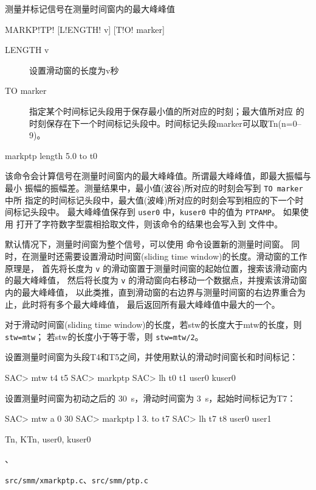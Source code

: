 \label{cmd:markptp}

测量并标记信号在测量时间窗内的最大峰峰值

\begin{SACSTX}
MARKP!TP! [L!ENGTH! v] [T!O! marker]
\end{SACSTX}

\begin{description}
\item [LENGTH v] 设置滑动窗的长度为v秒
\item [TO marker] 指定某个时间标记头段用于保存最小值的所对应的时刻；最大值所对应
    的时刻保存在下一个时间标记头段中。时间标记头段marker可以取Tn(n=0--9)。
\end{description}

\begin{SACDFT}
markptp length 5.0 to t0
\end{SACDFT}

该命令会计算信号在测量时间窗内的最大峰峰值。所谓最大峰峰值，即最大振幅与最小
振幅的振幅差。测量结果中，最小值(波谷)所对应的时刻会写到 \texttt{TO marker} 中所
指定的时间标记头段中，最大值(波峰)所对应的时刻会写到相应的下一个时间标记头段中。
最大峰峰值保存到 \texttt{user0} 中，\texttt{kuser0} 中的值为 \texttt{PTPAMP}。
如果使用  打开了字符数字型震相拾取文件，则该命令的结果也会写入到
文件中。

默认情况下，测量时间窗为整个信号，可以使用  命令设置新的测量时间窗。
同时，在测量时还需要设置滑动时间窗(sliding time window)的长度。滑动窗的工作原理是，
首先将长度为 \texttt{v} 的滑动窗置于测量时间窗的起始位置，搜索该滑动窗内的最大峰峰值，
然后将长度为 \texttt{v} 的滑动窗向右移动一个数据点，并搜索该滑动窗内的最大峰峰值，
以此类推，直到滑动窗的右边界与测量时间窗的右边界重合为止，此时将有多个最大峰峰值，
最后返回所有最大峰峰值中最大的一个。

对于滑动时间窗(sliding time window)的长度，若stw的长度大于mtw的长度，则 \texttt{stw=mtw}；
若stw的长度小于等于零，则 \texttt{stw=mtw/2}。

设置测量时间窗为头段T4和T5之间，并使用默认的滑动时间窗长和时间标记：
\begin{SACCode}
SAC> mtw t4 t5
SAC> markptp
SAC> lh t0 t1 user0 kuser0
\end{SACCode}

设置测量时间窗为初动之后的 \SI{30}{s}，滑动时间窗为 \SI{3}{s}，起始时间标记为T7：
\begin{SACCode}
SAC> mtw a 0 30
SAC> markptp l 3. to t7
SAC> lh t7 t8 user0 user1
\end{SACCode}

Tn, KTn, user0, kuser0

、

\texttt{src/smm/xmarkptp.c}、\texttt{src/smm/ptp.c}
